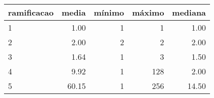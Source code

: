 \begin{table}[ht]
\centering
\begin{tabular}{lrrrr}
  \hline
ramificacao & media & mínimo & máximo & mediana \\ 
  \hline
1 & 1.00 &   1 &   1 & 1.00 \\ 
  2 & 2.00 &   2 &   2 & 2.00 \\ 
  3 & 1.64 &   1 &   3 & 1.50 \\ 
  4 & 9.92 &   1 & 128 & 2.00 \\ 
  5 & 60.15 &   1 & 256 & 14.50 \\ 
   \hline
\end{tabular}
\end{table}
